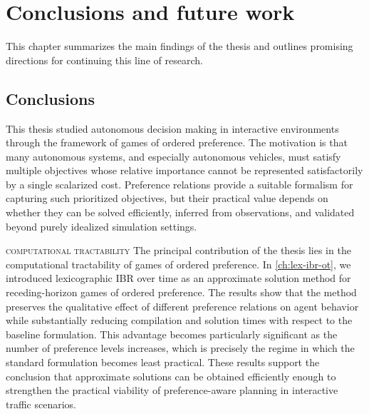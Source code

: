 \chapter{Conclusions and future work}
\label{ch:conclusions}

This chapter summarizes the main findings of the thesis and outlines
promising directions for continuing this line of research.

\section{Conclusions}

This thesis studied autonomous decision making in interactive
environments through the framework of games of ordered preference. The
motivation is that many autonomous systems, and especially autonomous
vehicles, must satisfy multiple objectives whose relative importance
cannot be represented satisfactorily by a single scalarized cost.
Preference relations provide a suitable formalism for capturing such
prioritized objectives, but their practical value depends on whether
they can be solved efficiently, inferred from observations, and
validated beyond purely idealized simulation settings.

\smallskip \noindent
\textsc{computational tractability} \quad
The principal contribution of the thesis lies in the computational
tractability of games of ordered preference. In
\cref{ch:lex-ibr-ot}, we introduced lexicographic IBR over time as an
approximate solution method for receding-horizon games of ordered
preference. The results show that the method preserves the qualitative
effect of different preference relations on agent behavior while
substantially reducing compilation and solution times with respect to the
baseline formulation. This advantage becomes particularly significant as
the number of preference levels increases, which is precisely the regime
in which the standard formulation becomes least practical. These results
support the conclusion that approximate solutions
can be obtained efficiently enough to strengthen the practical viability
of preference-aware planning in interactive traffic scenarios.

